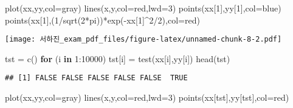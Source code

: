 \documentclass[
]{article}
\newenvironment{Shaded}{\begin{snugshade}}{\end{snugshade}}
\newcommand{\AttributeTok}[1]{\textcolor[rgb]{0.77,0.63,0.00}{#1}}
\newcommand{\ControlFlowTok}[1]{\textcolor[rgb]{0.13,0.29,0.53}{\textbf{#1}}}
\newcommand{\DecValTok}[1]{\textcolor[rgb]{0.00,0.00,0.81}{#1}}
\newcommand{\FunctionTok}[1]{\textcolor[rgb]{0.00,0.00,0.00}{#1}}
\newcommand{\NormalTok}[1]{#1}
\newcommand{\OtherTok}[1]{\textcolor[rgb]{0.56,0.35,0.01}{#1}}
\newcommand{\SpecialCharTok}[1]{\textcolor[rgb]{0.00,0.00,0.00}{#1}}
\newcommand{\StringTok}[1]{\textcolor[rgb]{0.31,0.60,0.02}{#1}}
\begin{document}
\begin{Shaded}
\begin{Highlighting}[]
\FunctionTok{plot}\NormalTok{(xx,yy,}\AttributeTok{col=}\StringTok{\textquotesingle{}gray\textquotesingle{}}\NormalTok{)}
\FunctionTok{lines}\NormalTok{(x,y,}\AttributeTok{col=}\StringTok{\textquotesingle{}red\textquotesingle{}}\NormalTok{,}\AttributeTok{lwd=}\DecValTok{3}\NormalTok{)}
\FunctionTok{points}\NormalTok{(xx[}\DecValTok{1}\NormalTok{],yy[}\DecValTok{1}\NormalTok{],}\AttributeTok{col=}\StringTok{\textquotesingle{}blue\textquotesingle{}}\NormalTok{)}
\FunctionTok{points}\NormalTok{(xx[}\DecValTok{1}\NormalTok{],(}\DecValTok{1}\SpecialCharTok{/}\FunctionTok{sqrt}\NormalTok{(}\DecValTok{2}\SpecialCharTok{*}\NormalTok{pi))}\SpecialCharTok{*}\FunctionTok{exp}\NormalTok{(}\SpecialCharTok{{-}}\NormalTok{xx[}\DecValTok{1}\NormalTok{]}\SpecialCharTok{\^{}}\DecValTok{2}\SpecialCharTok{/}\DecValTok{2}\NormalTok{),}\AttributeTok{col=}\StringTok{\textquotesingle{}red\textquotesingle{}}\NormalTok{)}
\end{Highlighting}
\end{Shaded}

\texttt{[image: 서하진\_exam\_pdf\_files/figure-latex/unnamed-chunk-8-2.pdf]}

\begin{Shaded}
\begin{Highlighting}[]
\NormalTok{tst }\OtherTok{=} \FunctionTok{c}\NormalTok{()}
\ControlFlowTok{for}\NormalTok{ (i }\ControlFlowTok{in} \DecValTok{1}\SpecialCharTok{:}\DecValTok{10000}\NormalTok{) tst[i] }\OtherTok{=} \FunctionTok{test}\NormalTok{(xx[i],yy[i])}
\FunctionTok{head}\NormalTok{(tst)}
\end{Highlighting}
\end{Shaded}

\begin{verbatim}
## [1] FALSE FALSE FALSE FALSE FALSE  TRUE
\end{verbatim}

\begin{Shaded}
\begin{Highlighting}[]
\FunctionTok{plot}\NormalTok{(xx,yy,}\AttributeTok{col=}\StringTok{\textquotesingle{}gray\textquotesingle{}}\NormalTok{)}
\FunctionTok{lines}\NormalTok{(x,y,}\AttributeTok{col=}\StringTok{\textquotesingle{}red\textquotesingle{}}\NormalTok{,}\AttributeTok{lwd=}\DecValTok{3}\NormalTok{)}
\FunctionTok{points}\NormalTok{(xx[tst],yy[tst],}\AttributeTok{col=}\StringTok{\textquotesingle{}red\textquotesingle{}}\NormalTok{)}
\end{Highlighting}
\end{Shaded}
\end{document}
